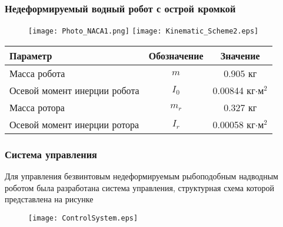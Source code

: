 %
%

\begin{frame}
\frametitle{Недеформируемый водный робот с острой кромкой}

\begin{figure}[!ht]
	\centering
	\texttt{[image: Photo\_NACA1.png]} \hspace{10mm} \texttt{[image: Kinematic\_Scheme2.eps]}
\end{figure}

\begin{table}[h]
	\centering
	\begin{tabular}{|l|c|c|}
		\hline
		Параметр & Обозначение & Значение \\ \hline
		Масса робота & $m$ & $0.905$ кг \\
		Осевой момент инерции робота & $I_0$ & 0.00844 кг$\cdot$м$^2$ \\
		Масса ротора & $m_r$ &  0.327 кг \\
		Осевой момент инерции ротора & $I_r$ & 0.00058 кг$\cdot$м$^2$ \\
		\hline
	\end{tabular}
	\label{tab1}
\end{table}

\end{frame}


\begin{frame}
\frametitle{Система управления}
Для управления безвинтовым недеформируемым рыбоподобным надводным роботом была разработана система управления, структурная схема которой представлена на рисунке

\begin{figure}[!h]
\centering
\texttt{[image: ControlSystem.eps]}
\end{figure}

\end{frame}

